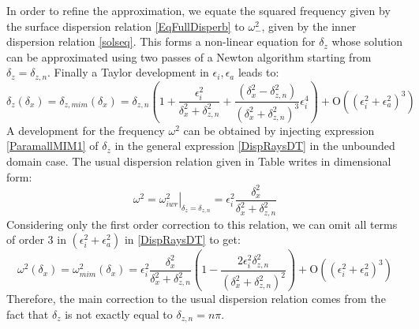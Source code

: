 In order to refine the approximation, we equate the squared frequency given by the surface dispersion relation \ref{EqFullDisperb} to $\omega_-^2$, given by the inner dispersion relation \ref{solseq}. This forms a non-linear equation for $\delta_z$ whose solution can be approximated using two passes of a Newton algorithm starting from $\delta_z=\delta_{z,n}$. Finally a Taylor development in $\epsilon_i, \epsilon_a$ leads to:
\begin{equation}
\delta_{z}(\delta_x)=\delta_{z,mim}(\delta_x)=
	\delta_{z,n}
	\left(
	1+\frac{\epsilon_i^2}{\delta_x^2+\delta_{z,n}^2}
	+\frac{(\delta_x^2-\delta_{z,n}^2)}{(\delta_x^2+\delta_{z,n}^2)^3}\epsilon_i^4
	\right)
	+\mathrm{O}	((\epsilon_i^2+\epsilon_a^2)^3)
	\label{ParamallMIM1}
\end{equation}
A development for the frequency $\omega^2$ can be obtained by injecting expression \ref{ParamallMIM1} of $\delta_z$ in the general expression \ref{DispRaysDT} in the unbounded domain case. The usual dispersion relation given in Table   writes in dimensional form:
\[
\omega^2=\left.\omega_{iwr}^2\right|_{\delta_z=\delta_{z,n}}=\epsilon_i^2\frac{\delta_x^2}{\delta_x^2+\delta_{z,n}^2}
\]
Considering only the first order correction to this relation, we can omit all terms of order 3 in $(\epsilon_i^2+\epsilon_a^2)$ in \ref{DispRaysDT} to get:
 \begin{equation}
\omega^2(\delta_x)=\omega_{mim}^2(\delta_x)=
\epsilon_i^2\frac{\delta_x^2}{\delta_x^2+\delta_{z,n}^2}
\left(1-\frac{2\epsilon_i^2\delta_{z,n}^2}{(\delta_x^2+\delta_{z,n}^2)^2}\right) +\mathrm{O}	((\epsilon_i^2+\epsilon_a^2)^3)
\label{ParamallMIM2}
\end{equation}
Therefore, the main correction to the usual dispersion relation comes from the fact that $\delta_z$ is not exactly equal to $\delta_{z,n}=n\pi$.
